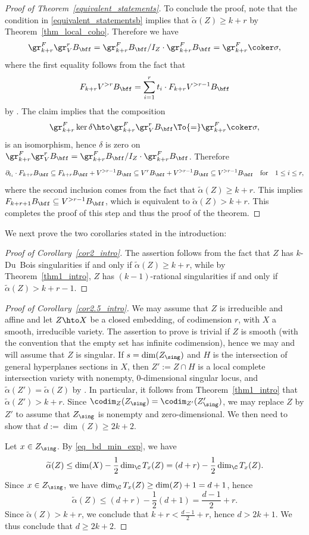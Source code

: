 \begin{proof}[Proof of Theorem~\ref{equivalent_statements}]
To conclude the proof, note that the condition in \eqref{equivalent_statementsb} implies that $\widetilde\alpha(Z)\geq k+r$ by
Theorem~\ref{thm_local_coho}. Therefore we have
\[\gr^F_{k+r}\gr^r_VB_\bff=\gr^F_{k+r}B_\bff/I_Z\cdot \gr^F_{k+r}B_\bff=\gr^F_{k+r} \coker\sigma,\]
where the first equality follows from the fact that
\[F_{k+r}V^{>r}B_{\bff}=\sum_{i=1}^r t_i\cdot F_{k+r}V^{>r-1}B_{\bff}\]
by \cite[Th.\,1.1]{CD}.
The claim implies that the composition
\[
\gr^F_{k+r}\ker\delta\hto \gr^F_{k+r}\gr^r_VB_\bff \To{=} \gr^F_{k+r} \coker\sigma,
\]
is an isomorphism, hence
$\delta$ is zero on $\gr^F_{k+r}\gr^r_V B_\bff=\gr^F_{k+r} B_\bff/I_Z\cdot\gr^F_{k+r} B_\bff$. Therefore
\[\partial_{t_i}\cdot F_{k+r}B_{\bff}\subseteq F_{k+r}B_{\bff}+V^{>r-1}B_{\bff}\subseteq V^rB_{\bff}+V^{>r-1}B_{\bff}\subseteq V^{>r-1}B_{\bff}\quad \text{for}\quad 1\leq i\leq r,\]
where the second inclusion comes from the fact that $\widetilde{\alpha}(Z)\geq k+r$.
This implies $F_{k+r+1}B_{\bff}\subseteq V^{>r-1}B_{\bff}$, which is equivalent to $\widetilde{\alpha}(Z)>k+r$.
This completes the proof of this step and thus the proof of the theorem.
\end{proof}

We next prove the two corollaries stated in the introduction:

\begin{proof}[Proof of Corollary~\ref{cor2_intro}]
The assertion follows from the fact that $Z$ has $k$-Du~Bois singularities if and only if $\widetilde{\alpha}(Z)\geq k+r$,
while by Theorem~\ref{thm1_intro}, $Z$ has $(k-1)$-rational singularities if and only if $\widetilde{\alpha}(Z)>k+r-1$.
\end{proof}

\begin{proof}[Proof of Corollary~\ref{cor2.5_intro}]
We may assume that $Z$ is irreducible and affine and let $Z\hto X$ be a closed embedding, of codimension $r$, with $X$ a smooth,
irreducible variety. The assertion to prove is trivial if $Z$ is smooth (with the convention that the empty set has infinite codimension),
hence we may and will assume that $Z$ is singular. If $s=\dim(Z_\sing)$ and
$H$ is the intersection of general hyperplanes sections in $X$, then $Z':=Z\cap H$ is a local complete intersection variety
with nonempty, $0$-dimensional singular locus,
and $\widetilde{\alpha}(Z')=\widetilde{\alpha}(Z)$ by \cite[Th.\,1.2]{CDMO}. In particular, it follows from
Theorem~\ref{thm1_intro} that $\widetilde{\alpha}(Z')>k+r$.
Since $\codim_Z(Z_\sing)=\codim_{Z'}(Z'_\sing)$, we may
replace $Z$ by $Z'$ to assume that
$Z_\sing$ is nonempty and zero-dimensional. We then need to show that $d:=\dim(Z)\geq 2k+2$.

Let $x\in Z_\sing$. By \eqref{eq_bd_min_exp}, we have
\[
\widetilde{\alpha}(Z) \leq \dim(X)-\frac{1}{2}\dim_{\C}T_x(Z)=(d+r)-\frac{1}{2}\dim_{\C}T_x(Z).
\]
Since $x\in Z_\sing$, we have $\dim_{\C}T_x(Z) \geq \dim(Z)+1=d+1$, hence
\[
\widetilde \alpha(Z) \leq (d+r)-\frac{1}{2}(d+1)=\frac{d-1}{2}+r.
\]
Since $\widetilde\alpha(Z)> k+r$, we conclude that $k+r<\frac{d-1}{2}+r$, hence $d>2k+1$.
We thus conclude that $d\geq 2k+2$.
\end{proof}

